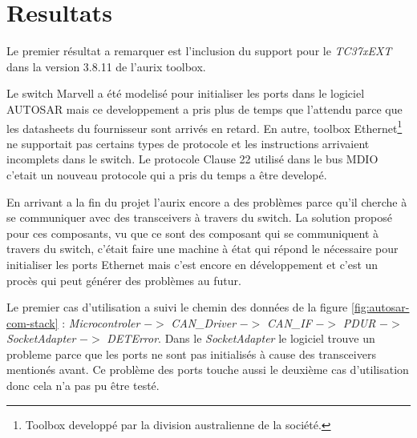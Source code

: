 \section{Resultats}

Le premier résultat a remarquer est l'inclusion du support pour le \textit{TC37xEXT} dans la version 3.8.11 de l'aurix toolbox.


Le switch Marvell a \'et\'e modelis\'e pour initialiser les ports dans le logiciel AUTOSAR mais ce developpement a pris plus de temps que l'attendu parce que les datasheets du fournisseur sont arriv\'es en retard. En autre, toolbox Ethernet\footnote{Toolbox developp\'e par la division australienne de la soci\'et\'e.} ne supportait pas certains types de protocole et les instructions arrivaient incomplets dans le switch. Le protocole Clause 22 utilis\'e dans le bus MDIO c'etait un nouveau protocole qui a pris du temps a \^etre develop\'e. 

En arrivant a la fin du projet l'aurix encore a des probl\`emes parce qu'il cherche \`a se communiquer avec des transceivers \`a travers du switch. La solution propos\'e pour ces composants, vu que ce sont des composant qui se communiquent \`a travers du switch, c'était faire une machine \`a \'etat qui répond le nécessaire pour initialiser les ports Ethernet mais c'est encore en développement et c'est un procès qui peut générer des problèmes au futur.

Le premier cas d'utilisation a suivi le chemin des donn\'ees de la figure \ref{fig:autosar-com-stack} : \textit{Microcontroler} $->$ \textit{CAN\_Driver} $->$ \textit{CAN\_IF} $->$ \textit{PDUR} $->$ \textit{SocketAdapter} $->$ \textit{DETError}. Dans le \textit{SocketAdapter} le logiciel trouve un probleme parce que les ports ne sont pas initialis\'es \`a cause des transceivers mention\'es avant. Ce probl\`eme des ports touche aussi le deuxième cas d'utilisation donc cela n'a pas pu \^etre test\'e.
